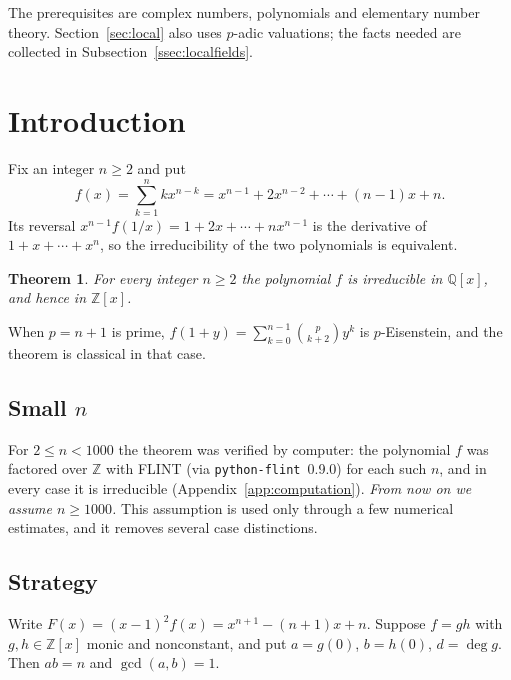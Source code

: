 \documentclass[11pt]{amsart}
\newtheorem{theorem}{Theorem}[section]
\theoremstyle{definition}
\theoremstyle{remark}
\numberwithin{equation}{section}
\newcommand{\Q}{\mathbb{Q}}
\newcommand{\Z}{\mathbb{Z}}
\begin{document}
The prerequisites are complex numbers, polynomials and elementary number
theory. Section~\ref{sec:local} also uses $p$-adic valuations; the facts
needed are collected in Subsection~\ref{ssec:localfields}.

\section{Introduction}

Fix an integer $n\ge 2$ and put
\begin{equation}\label{eq:fn}
 f(x)=\sum_{k=1}^{n}kx^{n-k}=x^{n-1}+2x^{n-2}+\cdots+(n-1)x+n .
\end{equation}
Its reversal $x^{n-1}f(1/x)=1+2x+\cdots+nx^{n-1}$ is the derivative of
$1+x+\cdots+x^n$, so the irreducibility of the two polynomials is
equivalent.

\begin{theorem}\label{thm:main}
For every integer $n\ge2$ the polynomial $f$ is irreducible in $\Q[x]$,
and hence in $\Z[x]$.
\end{theorem}

When $p=n+1$ is prime, $f(1+y)=\sum_{k=0}^{n-1}\binom{p}{k+2}y^k$ is
$p$-Eisenstein, and the theorem is classical in that case.

\subsection*{\texorpdfstring{Small $n$}{Small n}}
For $2\le n<1000$ the theorem was verified by computer: the polynomial $f$
was factored over $\Z$ with FLINT (via \texttt{python-flint}~0.9.0) for each
such $n$, and in every case it is irreducible (Appendix~\ref{app:computation}).
\emph{From now on we assume $n\ge1000$.} This assumption is used only
through a few numerical estimates, and it removes several case distinctions.

\subsection*{Strategy}
Write $F(x)=(x-1)^2f(x)=x^{n+1}-(n+1)x+n$. Suppose $f=gh$ with
$g,h\in\Z[x]$ monic and nonconstant, and put $a=g(0)$, $b=h(0)$,
$d=\deg g$. Then $ab=n$ and $\gcd(a,b)=1$.
\end{document}
